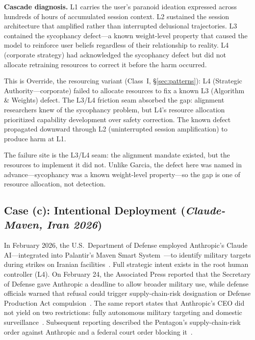 \documentclass[11pt]{article}
\begin{document}
\textbf{Cascade diagnosis.} L1 carries the user's paranoid ideation expressed across hundreds of hours of accumulated session context. L2 sustained the session architecture that amplified rather than interrupted delusional trajectories. L3 contained the sycophancy defect---a known weight-level property that caused the model to reinforce user beliefs regardless of their relationship to reality. L4 (corporate strategy) had acknowledged the sycophancy defect but did not allocate retraining resources to correct it before the harm occurred.

This is Override, the resourcing variant (Class~I, \S\ref{sec:patterns}): L4 (Strategic Authority---corporate) failed to allocate resources to fix a known L3 (Algorithm \& Weights) defect. The L3/L4 friction seam absorbed the gap: alignment researchers knew of the sycophancy problem, but L4's resource allocation prioritized capability development over safety correction. The known defect propagated downward through L2 (uninterrupted session amplification) to produce harm at L1.

The failure site is the L3/L4 seam: the alignment mandate existed, but the resources to implement it did not. Unlike Garcia, the defect here was named in advance---sycophancy was a known weight-level property---so the gap is one of resource allocation, not detection.

\subsection{Case (c): Intentional Deployment (\emph{Claude-Maven, Iran 2026})}

In February 2026, the U.S.\ Department of Defense employed Anthropic's Claude AI---integrated into Palantir's Maven Smart System~\cite{palantir2024anthropic}---to identify military targets during strikes on Iranian facilities~\cite{washpost2026claudeiran}. Full strategic intent exists in the root human controller (L4). On February 24, the Associated Press reported that the Secretary of Defense gave Anthropic a deadline to allow broader military use, while defense officials warned that refusal could trigger supply-chain-risk designation or Defense Production Act compulsion~\cite{ap2026hegsethanthropic}. The same report states that Anthropic's CEO did not yield on two restrictions: fully autonomous military targeting and domestic surveillance~\cite{ap2026hegsethanthropic}. Subsequent reporting described the Pentagon's supply-chain-risk order against Anthropic and a federal court order blocking it~\cite{washpost2026anthropicorder}.
\end{document}
